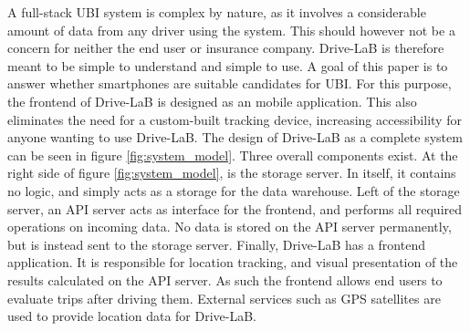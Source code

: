 A full-stack UBI system is complex by nature, as it involves a considerable amount of data from any driver using the system. This should however not be a concern for neither the end user or insurance company. Drive-LaB is therefore meant to be simple to understand and simple to use.
A goal of this paper is to answer whether smartphones are suitable candidates for UBI. For this purpose, the frontend of Drive-LaB is designed as an mobile application. This also eliminates the need for a custom-built tracking device, increasing accessibility for anyone wanting to use Drive-LaB.
The design of Drive-LaB as a complete system can be seen in figure \ref{fig:system_model}. Three overall components exist. At the right side of figure \ref{fig:system_model}, is the storage server. In itself, it contains no logic, and simply acts as a storage for the data warehouse. Left of the storage server, an API server acts as interface for the frontend, and performs all required operations on incoming data. No data is stored on the API server permanently, but is instead sent to the storage server. Finally, Drive-LaB has a frontend application. It is responsible for location tracking, and visual presentation of the results calculated on the API server. As such the frontend allows end users to evaluate trips after driving them. External services such as GPS satellites are used to provide location data for Drive-LaB.

